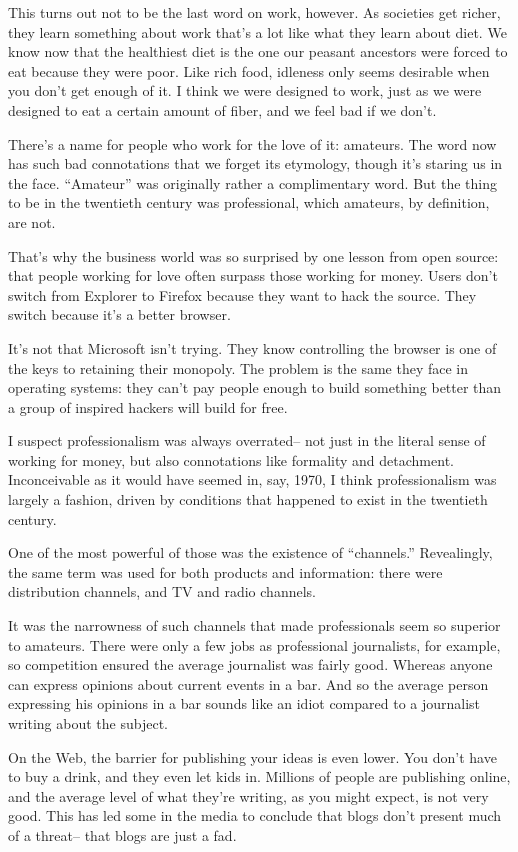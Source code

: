 This turns out not to be the last word on work, however. As societies
get richer, they learn something about work that's a lot like what they
learn about diet. We know now that the healthiest diet is the one our
peasant ancestors were forced to eat because they were poor. Like rich
food, idleness only seems desirable when you don't get enough of it. I
think we were designed to work, just as we were designed to eat a
certain amount of fiber, and we feel bad if we don't.

There's a name for people who work for the love of it: amateurs. The
word now has such bad connotations that we forget its etymology, though
it's staring us in the face. ``Amateur'' was originally rather a
complimentary word. But the thing to be in the twentieth century was
professional, which amateurs, by definition, are not.

That's why the business world was so surprised by one lesson from open
source: that people working for love often surpass those working for
money. Users don't switch from Explorer to Firefox because they want to
hack the source. They switch because it's a better browser.

It's not that Microsoft isn't trying. They know controlling the browser
is one of the keys to retaining their monopoly. The problem is the same
they face in operating systems: they can't pay people enough to build
something better than a group of inspired hackers will build for free.

I suspect professionalism was always overrated-- not just in the literal
sense of working for money, but also connotations like formality and
detachment. Inconceivable as it would have seemed in, say, 1970, I think
professionalism was largely a fashion, driven by conditions that
happened to exist in the twentieth century.

One of the most powerful of those was the existence of ``channels.''
Revealingly, the same term was used for both products and information:
there were distribution channels, and TV and radio channels.

It was the narrowness of such channels that made professionals seem so
superior to amateurs. There were only a few jobs as professional
journalists, for example, so competition ensured the average journalist
was fairly good. Whereas anyone can express opinions about current
events in a bar. And so the average person expressing his opinions in a
bar sounds like an idiot compared to a journalist writing about the
subject.

On the Web, the barrier for publishing your ideas is even lower. You
don't have to buy a drink, and they even let kids in. Millions of people
are publishing online, and the average level of what they're writing, as
you might expect, is not very good. This has led some in the media to
conclude that blogs don't present much of a threat-- that blogs are just
a fad.


